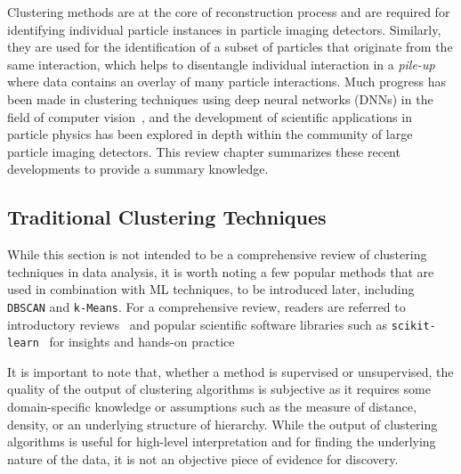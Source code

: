 \documentclass{ws-rv9x6}
\begin{document}
Clustering methods are at the core of reconstruction process and are required for identifying individual particle instances in particle imaging detectors. Similarly, they are used for the identification of a subset of particles that originate from the same interaction, which helps to disentangle individual interaction in a {\it pile-up} where data contains an overlay of many particle interactions. Much progress has been made in clustering techniques using deep neural networks (DNNs) in the field of computer vision~\cite{renNIPS15fasterrcnn,disc,8237584,8953222}, and the development of scientific applications in particle physics has been explored in depth within the community of large particle imaging detectors. This review chapter summarizes these recent developments to provide a summary knowledge.


\subsection{Traditional Clustering Techniques}
While this section is not intended to be a comprehensive review of clustering techniques in data analysis, it is worth noting a few popular methods that are used in combination with ML techniques, to be introduced later, including \verb|DBSCAN| and \verb|k-Means|. For a comprehensive review, readers are referred to introductory reviews~ and popular scientific software libraries such as \verb|scikit-learn|~\cite{scikit} for insights and hands-on practice

It is important to note that, whether a method is supervised or unsupervised, the quality of the output of clustering algorithms is subjective as it requires some domain-specific knowledge or assumptions such as the measure of distance, density, or an underlying structure of hierarchy. While the output of clustering algorithms is useful for high-level interpretation and for finding the underlying nature of the data, it is not an objective piece of evidence for discovery.
\end{document}
